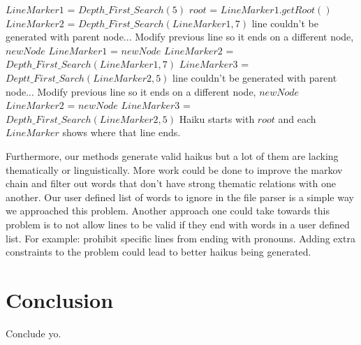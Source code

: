 \documentclass[]{article}
\begin{document}
\begin{algorithm}[H]
	\caption{$Depth\_First\_Search\_Whole\_Haiku()$} \label{Alg:DFSWhole}
	\begin{algorithmic}[1]
		\State $LineMarker1$ = $Depth\_First\_Search(5)$
		\State $root$ = $LineMarker1.getRoot()$
		\State $LineMarker2$ = $Depth\_First\_Search(LineMarker1, 7)$
		 line couldn't be generated with parent node...
			\State Modify previous line so it ends on a different node, $newNode$
			\State $LineMarker1$ = $newNode$
			\State $LineMarker2$ = $Depth\_First\_Search(LineMarker1,7)$
		\EndIf
		\State $LineMarker3$ = $Deptt\_First\_Sarch(LineMarker2,5)$
		 line couldn't be generated with parent node...
			\State Modify previous line so it ends on a different node, $newNode$
			\State $LineMarker2$ = $newNode$
			\State $LineMarker3$ = $Depth\_First\_Search(LineMarker2,5)$
		\EndIf
		\State Haiku starts with $root$ and each $LineMarker$ shows where that line ends.
	\end{algorithmic}
\end{algorithm}

Furthermore, our methods generate valid haikus but a lot of them are lacking thematically or linguistically. More work could be done to improve the markov chain and filter out words that don't have strong thematic relations with one another. Our user defined list of words to ignore in the file parser is a simple way we approached this problem. Another approach one could take towards this problem is to not allow lines to be valid if they end with words in a user defined list. For example: prohibit specific lines from ending with pronouns. Adding extra constraints to the problem could lead to better haikus being generated.

\section{Conclusion}
Conclude yo.



\end{document}
